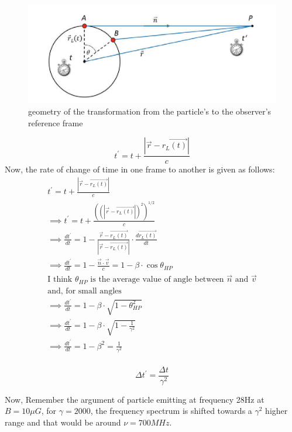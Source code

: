 \documentclass[11pt]{report}
\newcommand{\de}[2]{\frac{d{#1}}{d{#2}}}
\newcommand{\cbox}{tcolorbox}
\newcommand{\cc}[1]{\left({#1}\right)}
\newcommand{\tx}[1]{\text{#1}}
\begin{document}
\begin{figure}[h!]\label{figtrans}
\includegraphics[width=\linewidth]{figtrans.png}
\caption{geometry of the transformation from the particle's to the observer's reference frame}
\end{figure}
\begin{equation}
t^\prime=t+\frac{|\vec{r}-\vec{r_L(t)}|}{c}
\end{equation}
Now, the rate of change of time in one frame to another is given as follows:
\begin{eqnarray*}
t^\prime=t+\frac{|\vec{r}-\vec{r_L(t)}|}{c}\\
\implies t^\prime=t+\frac{\cc{\cc{|\vec{r}-\vec{r_L(t)}|}^2}^{1/2}}{c}\\
\implies \de{t^\prime}{t}=1-\frac{\vec{r}-\vec{r_L(t)}}{|\vec{r}-\vec{r_L(t)}|}\cdot \de{\vec{r_L(t)}}{t}\\
\implies \de{t^\prime}{t}=1-\frac{\vec{n}\cdot \vec{v}}{c}=1-\beta \cdot \cos \theta_{HP}\\
\tx{I think $\theta_{HP}$ is the average value of angle between $\vec{n}$ and $\vec{v}$}\\
\tx{and, for small angles}\\
\implies \de{t^\prime}{t}=1-\beta \cdot \sqrt{1- \theta^2_{HP}} \\
\implies \de{t^\prime}{t}=1-\beta \cdot \sqrt{1- \frac{1}{\gamma^2}} \\
\implies \de{t^\prime}{t}=1-\beta^2 =\frac{1}{\gamma^2} \\
\end{eqnarray*}
\begin{\cbox}
\begin{equation}
\Delta t^\prime =\frac{\Delta t }{\gamma^2}
\end{equation}

\end{\cbox}
Now, Remember the argument of particle emitting at frequency 28Hz at $B=10\mu G$, for $\gamma=2000$, the frequency spectrum is shifted towards a $\gamma^2$ higher range and that would be around $\nu=700MHz$.\\
\end{document}
